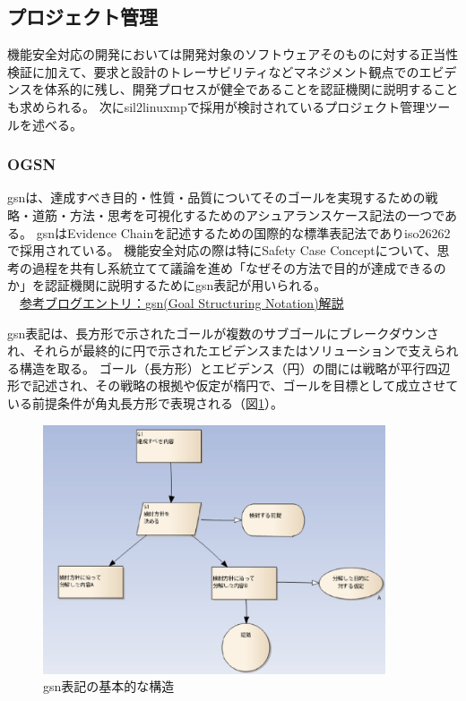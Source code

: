 \subsection{プロジェクト管理}
機能安全対応の開発においては開発対象のソフトウェアそのものに対する正当性検証に加えて、要求と設計のトレーサビリティなどマネジメント観点でのエビデンスを体系的に残し、開発プロセスが健全であることを認証機関に説明することも求められる。
次に\acrshort{sil2linuxmp}で採用が検討されているプロジェクト管理ツールを述べる。
\subsubsection{OGSN}
\label{ogsn}
\gls{gsn}は、達成すべき目的・性質・品質についてそのゴールを実現するための戦略・道筋・方法・思考を可視化するためのアシュアランスケース記法の一つである。
\acrshort{gsn}はEvidence Chainを記述するための国際的な標準表記法であり\acrshort{iso26262}で採用されている。
機能安全対応の際は特にSafety Case Conceptについて、思考の過程を共有し系統立てて議論を進め「なぜその方法で目的が達成できるのか」を認証機関に説明するために\acrshort{gsn}表記が用いられる。\\
　\href{http://blogs.itmedia.co.jp/hiranabe/2013/11/goal-structuring-network.html}{参考ブログエントリ：\acrshort{gsn}(Goal Structuring Notation)解説} \cite{gsne}
\par
\acrshort{gsn}表記は、長方形で示されたゴールが複数のサブゴールにブレークダウンされ、それらが最終的に円で示されたエビデンスまたはソリューションで支えられる構造を取る。
ゴール（長方形）とエビデンス（円）の間には戦略が平行四辺形で記述され、その戦略の根拠や仮定が楕円で、ゴールを目標として成立させている前提条件が角丸長方形で表現される（図\ref{gsn}）。
\begin{figure}[ht]
  \centering
  \includegraphics[width=0.9\textwidth]{pic/gsn.eps}
  \caption{\acrshort{gsn}表記の基本的な構造}
  \label{gsn}
\end{figure}
